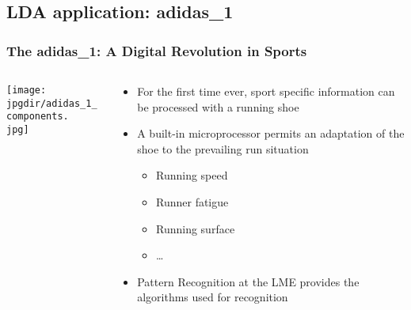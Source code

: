 

\subsection{LDA application: adidas\_1 }

\begin{frame}
	\frametitle{The adidas\_1: A Digital Revolution in Sports}

	\vspace{.5cm}
	\begin{columns}[c,onlytextwidth]
		\begin{column}{0.4\textwidth}
			\texttt{[image: \\jpgdir/adidas\_1\_components.\\jpg]}
		\end{column}\begin{column}{0.6\textwidth}
			\begin{itemize}
				\item For the first time ever, sport specific information can be processed with a running shoe
				\item A built-in microprocessor permits an adaptation of the shoe to the prevailing run situation
				      \begin{itemize}
					      \item Running speed
					      \item Runner fatigue
					      \item Running surface
					      \item \ldots
				      \end{itemize}
				\item Pattern Recognition at the LME provides the algorithms used for recognition
			\end{itemize}
		\end{column}
	\end{columns}
\end{frame}


